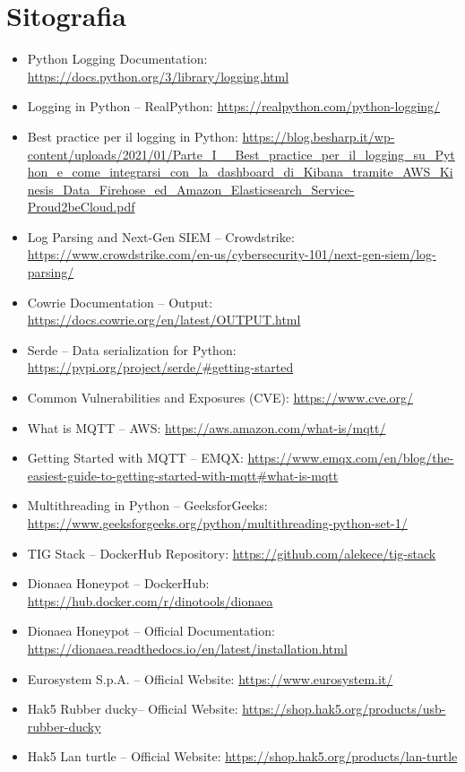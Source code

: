 \chapter{Sitografia}
\label{cap:webliography}

\begin{itemize}
    \item Python Logging Documentation: \url{https://docs.python.org/3/library/logging.html}
    \item Logging in Python – RealPython: \url{https://realpython.com/python-logging/}
    \item Best practice per il logging in Python: \url{https://blog.besharp.it/wp-content/uploads/2021/01/Parte_I__Best_practice_per_il_logging_su_Python_e_come_integrarsi_con_la_dashboard_di_Kibana_tramite_AWS_Kinesis_Data_Firehose_ed_Amazon_Elasticsearch_Service-Proud2beCloud.pdf}
    \item Log Parsing and Next-Gen SIEM – Crowdstrike: \url{https://www.crowdstrike.com/en-us/cybersecurity-101/next-gen-siem/log-parsing/}
    \item Cowrie Documentation – Output: \url{https://docs.cowrie.org/en/latest/OUTPUT.html}
    \item Serde – Data serialization for Python: \url{https://pypi.org/project/serde/#getting-started}
    \item Common Vulnerabilities and Exposures (CVE): \url{https://www.cve.org/}
    \item What is MQTT – AWS: \url{https://aws.amazon.com/what-is/mqtt/}
    \item Getting Started with MQTT – EMQX: \url{https://www.emqx.com/en/blog/the-easiest-guide-to-getting-started-with-mqtt#what-is-mqtt}
    \item Multithreading in Python – GeeksforGeeks: \url{https://www.geeksforgeeks.org/python/multithreading-python-set-1/}
    \item TIG Stack – DockerHub Repository: \url{https://github.com/alekece/tig-stack}
    \item Dionaea Honeypot – DockerHub: \url{https://hub.docker.com/r/dinotools/dionaea}
    \item Dionaea Honeypot – Official Documentation: \url{https://dionaea.readthedocs.io/en/latest/installation.html}
    \item Eurosystem S.p.A. – Official Website: \url{https://www.eurosystem.it/}
    \item Hak5 Rubber ducky– Official Website: \url{https://shop.hak5.org/products/usb-rubber-ducky}
    \item Hak5 Lan turtle – Official Website: \url{https://shop.hak5.org/products/lan-turtle}
\end{itemize}